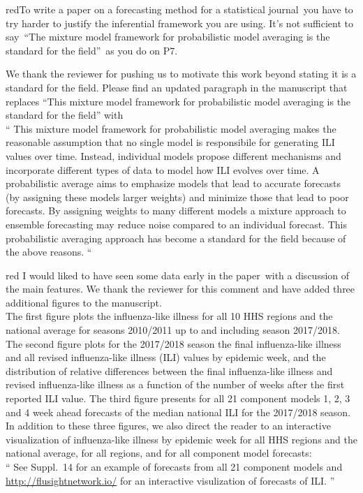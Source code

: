\documentclass[
  fontsize=11pt,
  paper=a4,
  parskip=half,
  enlargefirstpage=on,    %
  fromalign=right,        %
  fromphone=on,           %
  fromrule=aftername,     %
  addrfield=on,           %
  backaddress=on,         %
  subject=beforeopening,  %
  locfield=narrow,        %
  foldmarks=on,           %
]{scrlttr2}
\begin{document}
    \begin{commt}{red}{To write a paper on a forecasting method for a statistical journal\, you have to try harder to justify the inferential framework you are using. It’s not sufficient to say\, ``The mixture model framework for probabilistic model averaging is the standard for the field''\, as you do on P7.}

      We thank the reviewer for pushing us to motivate this work beyond stating it is a standard for the field.
      Please find an updated paragraph in the manuscript that replaces ``This mixture model framework for probabilistic model averaging is the standard for the field'' with\\

      ``
      This mixture model framework for probabilistic model averaging makes the reasonable assumption that no single model is responsibile for generating ILI values over time.
      Instead, individual models propose different mechanisms and incorporate different types of data to model how ILI evolves over time.
      A probabilistic average aims to emphasize models that lead to accurate forecasts (by assigning these models larger weights) and minimize those that lead to poor forecasts.
      By assigning weights to many different models a mixture approach to ensemble forecasting may reduce noise compared to an individual forecast.
      This probabilistic averaging approach has become a standard for the field because of the above reasons.
      ``
    \end{commt}

    \begin{commt}{red}{ I would liked to have seen some data early in the paper\, with a discussion of the main features.}
      We thank the reviewer for this comment and have added three additional figures to the manuscript.\\
      
      The first figure plots the influenza-like illness for all 10 HHS regions and the national average for seasons 2010/2011 up to and including season 2017/2018.
      The second figure plots for the 2017/2018 season the final influenza-like illness and all revised influenza-like illness (ILI) values by epidemic week, and the distribution of relative differences between the final influenza-like illness and revised influenza-like illness as a function of the number of weeks after the first reported ILI value. 
      The third figure presents for all 21 component models 1, 2, 3 and 4 week ahead forecasts of the median national ILI for the 2017/2018 season.
      In addition to these three figures, we also direct the reader to an interactive visualization of influenza-like illness by epidemic week for all HHS regions and the national average, for all regions, and for all component model forecasts:\\

      ``
      See Suppl.~14 for an example of forecasts from all 21 component models and \href{Flusightnetwork.io}{http://flusightnetwork.io/} for an interactive visulization of forecasts of ILI.
      ''
      
    \end{commt}
\end{document}
